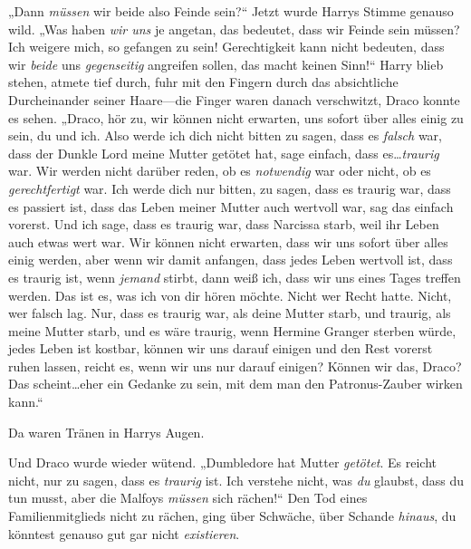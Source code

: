 „Dann \emph{müssen} wir beide also Feinde sein?“ Jetzt wurde Harrys Stimme genauso wild. „Was haben \emph{wir uns} je angetan, das bedeutet, dass wir Feinde sein müssen? Ich weigere mich, so gefangen zu sein! Gerechtigkeit kann nicht bedeuten, dass wir \emph{beide} uns \emph{gegenseitig} angreifen sollen, das macht keinen Sinn!“ Harry blieb stehen, atmete tief durch, fuhr mit den Fingern durch das absichtliche Durcheinander seiner Haare—die Finger waren danach verschwitzt, Draco konnte es sehen. „Draco, hör zu, wir können nicht erwarten, uns sofort über alles einig zu sein, du und ich. Also werde ich dich nicht bitten zu sagen, dass es \emph{falsch} war, dass der Dunkle Lord meine Mutter getötet hat, sage einfach, dass es…\emph{traurig} war. Wir werden nicht darüber reden, ob es \emph{notwendig} war oder nicht, ob es \emph{gerechtfertigt} war. Ich werde dich nur bitten, zu sagen, dass es traurig war, dass es passiert ist, dass das Leben meiner Mutter auch wertvoll war, sag das einfach vorerst. Und ich sage, dass es traurig war, dass Narcissa starb, weil ihr Leben auch etwas wert war. Wir können nicht erwarten, dass wir uns sofort über alles einig werden, aber wenn wir damit anfangen, dass jedes Leben wertvoll ist, dass es traurig ist, wenn \emph{jemand} stirbt, dann weiß ich, dass wir uns eines Tages treffen werden. Das ist es, was ich von dir hören möchte. Nicht wer Recht hatte. Nicht, wer falsch lag. Nur, dass es traurig war, als deine Mutter starb, und traurig, als meine Mutter starb, und es wäre traurig, wenn Hermine Granger sterben würde, jedes Leben ist kostbar, können wir uns darauf einigen und den Rest vorerst ruhen lassen, reicht es, wenn wir uns nur darauf einigen? Können wir das, Draco? Das scheint…eher ein Gedanke zu sein, mit dem man den Patronus-Zauber wirken kann.“

Da waren Tränen in Harrys Augen.

Und Draco wurde wieder wütend. „Dumbledore hat Mutter \emph{getötet}. Es reicht nicht, nur zu sagen, dass es \emph{traurig} ist. Ich verstehe nicht, was \emph{du} glaubst, dass du tun musst, aber die Malfoys \emph{müssen} sich rächen!“ Den Tod eines Familienmitglieds nicht zu rächen, ging über Schwäche, über Schande \emph{hinaus}, du könntest genauso gut gar nicht \emph{existieren}.

